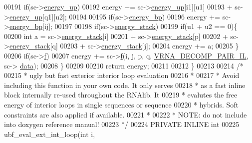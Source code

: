 \begin{DoxyCode}
00191     \textcolor{keywordflow}{if}(sc->\hyperlink{group__soft__constraints_a57e4dbb924ab11f304e3762a3a9b07a1}{energy\_up})
00192       energy += sc->\hyperlink{group__soft__constraints_a57e4dbb924ab11f304e3762a3a9b07a1}{energy\_up}[i1][u1]
00193                 + sc->\hyperlink{group__soft__constraints_a57e4dbb924ab11f304e3762a3a9b07a1}{energy\_up}[q1][u2];
00194 
00195     \textcolor{keywordflow}{if}(sc->\hyperlink{group__soft__constraints_ad139b8e06632e00cbcf3909815d0d03d}{energy\_bp})
00196       energy += sc->\hyperlink{group__soft__constraints_ad139b8e06632e00cbcf3909815d0d03d}{energy\_bp}[ij];
00197 
00198     \textcolor{keywordflow}{if}(sc->\hyperlink{group__soft__constraints_ac20dded6068e81acd0f1139092f66a22}{energy\_stack})
00199       \textcolor{keywordflow}{if}(u1 + u2 == 0)\{
00200         \textcolor{keywordtype}{int} a =   sc->\hyperlink{group__soft__constraints_ac20dded6068e81acd0f1139092f66a22}{energy\_stack}[i]
00201                   + sc->\hyperlink{group__soft__constraints_ac20dded6068e81acd0f1139092f66a22}{energy\_stack}[p]
00202                   + sc->\hyperlink{group__soft__constraints_ac20dded6068e81acd0f1139092f66a22}{energy\_stack}[q]
00203                   + sc->\hyperlink{group__soft__constraints_ac20dded6068e81acd0f1139092f66a22}{energy\_stack}[j];
00204         energy += a;
00205       \}
00206     \textcolor{keywordflow}{if}(sc->\hyperlink{group__soft__constraints_a32dc86090237888c75491bbd4861a04b}{f})
00207       energy += sc->\hyperlink{group__soft__constraints_a32dc86090237888c75491bbd4861a04b}{f}(i, j, p, q, \hyperlink{group__constraints_gaeab04f34d7730cff2d651d782f95d857}{VRNA\_DECOMP\_PAIR\_IL}, sc->
      \hyperlink{group__soft__constraints_a7574680143df97b9029146c2150bf06d}{data});
00208   \}
00209 
00210   \textcolor{keywordflow}{return} energy;
00211 
00212 \}
00213 
00214 \textcolor{comment}{/*}
00215 \textcolor{comment}{ *  ugly but fast exterior interior loop evaluation}
00216 \textcolor{comment}{ *}
00217 \textcolor{comment}{ *  Avoid including this function in your own code. It only serves}
00218 \textcolor{comment}{ *  as a fast inline block internally re-used throughout the RNAlib. It}
00219 \textcolor{comment}{ *  evalutes the free energy of interior loops in single sequences or sequence}
00220 \textcolor{comment}{ *  hybrids. Soft constraints are also applied if available.}
00221 \textcolor{comment}{ *}
00222 \textcolor{comment}{ *  NOTE: do not include into doxygen reference manual!}
00223 \textcolor{comment}{ */}
00224 PRIVATE INLINE \textcolor{keywordtype}{int}
00225 ubf\_eval\_ext\_int\_loop(\textcolor{keywordtype}{int} i,

\end{DoxyCode}
